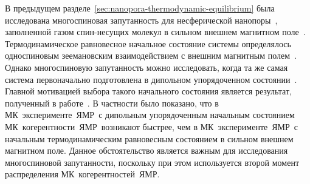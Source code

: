 В предыдущем разделе~\ref{sec:nanopora-thermodynamic-equilibrium} была исследована многоспиновая запутанность для несферической нанопоры~\cite{Doronin2019},
заполненной газом  спин-несущих молекул в сильном внешнем магнитном поле~\cite{Baugh2001,Doronin2009}.
Термодинамическое равновесное начальное состояние системы определялось односпиновым зеемановским взаимодействием с внешним магнитным полем~\cite{Doronin2007a}.
Однако  многоспиновую запутанность можно  исследовать,
когда та же самая система первоначально подготовлена в дипольном упорядоченном состоянии~\cite{Goldman1970}.
Главной мотивацией выбора такого начального состояния является результат, полученный в работе~\cite{Doronin2011}.
В частности было показано, что в МК~эксперименте~ЯМР~с дипольным упорядоченным начальным состоянием МК~когерентности~ЯМР~возникают быстрее,
чем в МК~эксперименте~ЯМР~с начальным термодинамическим равновесным состоянием в сильном внешнем магнитном поле.
Данное обстоятельство является важным для исследования многоспиновой запутанности,
поскольку при этом используется второй момент распределения МК~когерентностей~ЯМР.

